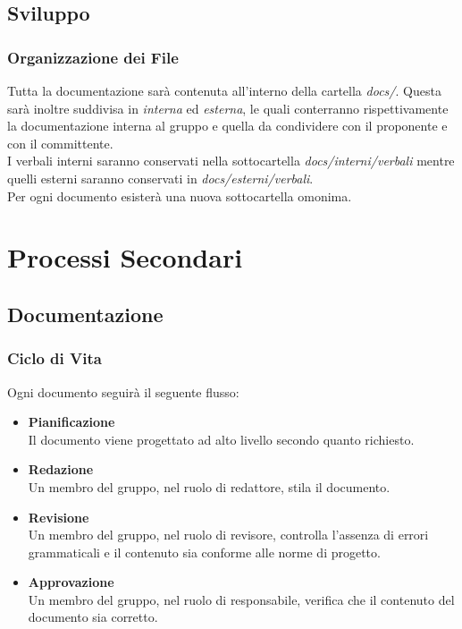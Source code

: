 \documentclass[a4paper, 12pt]{article}
\begin{document}
\subsection{Sviluppo}
\subsubsection{Organizzazione dei File}
Tutta la documentazione sarà contenuta all'interno della cartella \textit{docs/}. Questa sarà inoltre suddivisa in \textit{interna} ed \textit{esterna}, le quali conterranno rispettivamente la documentazione interna al gruppo e quella da condividere con il proponente e con il committente. \\
I verbali interni saranno conservati nella sottocartella \textit{docs/interni/verbali} mentre quelli esterni saranno conservati in \textit{docs/esterni/verbali}.\\
Per ogni documento esisterà una nuova sottocartella omonima.

\section{Processi Secondari}
\subsection{Documentazione}
\subsubsection{Ciclo di Vita}
Ogni documento seguirà il seguente flusso:
\begin{itemize}
    \item \textbf{Pianificazione} \\ Il documento viene progettato ad alto livello secondo quanto richiesto.
    \item \textbf{Redazione} \\ Un membro del gruppo, nel ruolo di redattore, stila il documento.
    \item \textbf{Revisione} \\ Un membro del gruppo, nel ruolo di revisore, controlla l'assenza di errori grammaticali e il contenuto sia conforme alle norme di progetto.
    \item \textbf{Approvazione} \\ Un membro del gruppo, nel ruolo di responsabile, verifica che il contenuto del documento sia corretto.
\end{itemize}
\end{document}
